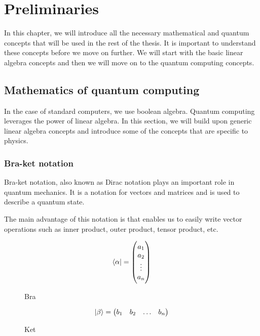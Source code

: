 \chapter{Preliminaries}\label{ch:preliminaries}
In this chapter, we will introduce all the necessary mathematical and quantum concepts that will be used in the rest of the thesis. It is important to understand these concepts before we move on further. We will start with the basic linear algebra concepts and then we will move on to the quantum computing concepts.
\section{Mathematics of quantum computing}
In the case of standard computers, we use boolean algebra. Quantum computing leverages the power of linear algebra. In this section, we will build upon generic linear algebra concepts and introduce some of the concepts that are specific to physics.

\subsection{Bra-ket notation}
Bra-ket notation, also known as Dirac notation plays an important role in quantum mechanics. It is a notation for vectors and matrices and is used to describe a quantum state. 

The main advantage of this notation is that enables us to easily write vector operations such as inner product, outer product, tensor product, etc.

\begin{figure}[h!]
    \begin{minipage}[b]{.5\textwidth}
    \centering
    $$\langle\alpha\rvert = \begin{pmatrix}
        a_1 \\
        a_2 \\
        \vdots \\
        a_n
    \end{pmatrix}$$
    \caption*{Bra}
    \end{minipage}
    \hfill
    \begin{minipage}[b]{.5\textwidth}
    \centering
    $$\lvert\beta\rangle = \begin{pmatrix}
        b_1 & b_2 & \hdots & b_n
    \end{pmatrix}
    $$
    \caption*{Ket}
    \end{minipage}
\end{figure}

